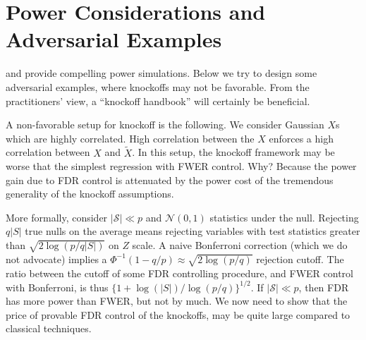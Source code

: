\documentclass[article,lineno]{biometrika}
\begin{document}
	
	
	
	
	\section{Power Considerations and Adversarial Examples}
	
	
	\cite{SesiaGenehuntinghidden} and \cite{CandesPanninggoldmodelX2018} provide compelling power simulations.
	Below we try to design some adversarial examples, where knockoffs may not be favorable.
	From the practitioners' view, a ``knockoff handbook'' will certainly be beneficial.
	
	A non-favorable setup for knockoff is the following. 
	We consider Gaussian $X$s which are highly correlated. High correlation between the $X$ enforces a high correlation between  $X$ and $\tilde X$. 
	In this setup, the knockoff framework may be  worse that the simplest regression with FWER control.
	Why?
	Because the power gain due to FDR control is attenuated by the power cost of the tremendous generality of the knockoff assumptions.
	
	More formally, consider $|\mathcal{S}|\ll p$ and $\mathcal{N}(0,1)$ statistics under the null.	
	Rejecting $q|S|$ true nulls on the average means rejecting variables with test statistics greater than $\sqrt{2\log(p/q|S|)}$ on $Z$ scale.
	A naive Bonferroni correction (which we do not advocate) implies a $\Phi^{-1}(1-q/p)\approx\sqrt{2\log (p/q)}$ rejection cutoff.
	The ratio between the cutoff of some FDR controlling procedure, and FWER control with Bonferroni, is thus $\bigl\{1+\log(|S|)/\log (p/q)\bigr\}^{1/2}$. 
	If $|\mathcal{S}|\ll p$, then FDR has more power than FWER, but not by much. 
	We now need to show that the price of provable FDR control of the knockoffs, may be quite large compared to classical techniques.
	
\end{document}
